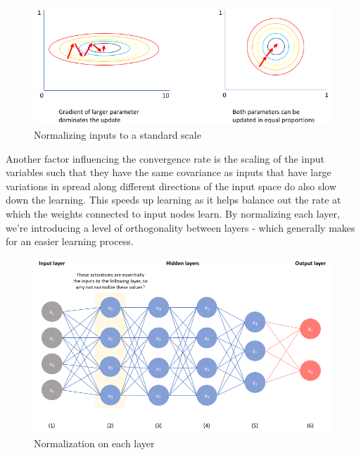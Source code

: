 \begin{figure}[ht]
\centering
\includegraphics[width=120mm]{lectures/02-b/Why_normalize.png}
\caption{Normalizing inputs to a standard scale}
\label{fig:normalize}
\end{figure}

Another factor influencing the convergence rate is the scaling of the input variables such that they have the same covariance as inputs that have large variations in spread along different directions of the input space do also slow down the learning. This speeds up learning as it helps balance out the rate at which the weights connected to input nodes learn. By normalizing each layer, we're introducing a level of orthogonality between layers - which generally makes for an easier learning process.\\

\begin{figure}[ht]
\centering
\includegraphics[width=120mm]{lectures/02-b/Benefit of normalization.png}
\caption{Normalization on each layer}
\label{fig:normalize2}
\end{figure}

